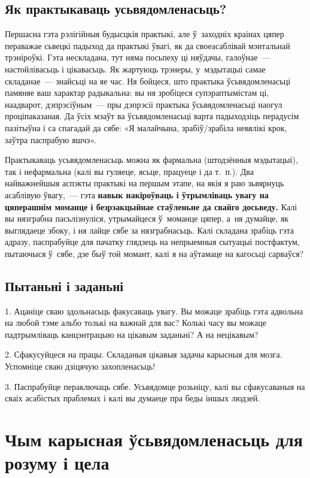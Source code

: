 \subsection*{Як практыкаваць усьвядомленасьць?}

Першасна гэта рэлігійныя будысцкія практыкі, але ў~заходніх краінах цяпер пераважае сьвецкі падыход да практыкі ўвагі, як да своеасаблівай мэнтальнай трэніроўкі. Гэта нескладана, тут няма посьпеху ці няўдачы, галоўнае~--- настойлівасьць і цікавасьць. Як жартуюць трэнеры, у~мэдытацыі самае складанае~--- знайсьці на яе час. Ня бойцеся, што практыка ўсьвядомленасьці памяняе ваш характар радыкальна: вы ня зробіцеся супэраптымістам ці, наадварот, дэпрэсіўным~--- пры дэпрэсіі практыка ўсьвядомленасьці наогул проціпаказаная. Да ўсіх мэаўт ва ўсьвядомленасьці варта падыходзіць перадусім пазітыўна і са спагадай да сябе: «Я малайчына, зрабіў/зрабіла невялікі крок, заўтра паспрабую яшчэ».

Практыкаваць усьвядомленасьць можна як фармальна (штодзённыя мэдытацыі), так і нефармальна (калі вы гуляеце, ясьце, працуеце і да т.~п.). Два найважнейшыя аспэкты практыкі на першым этапе, на якія я раю зьвярнуць асаблівую ўвагу,~--- гэта \textbf{навык накіроўваць і ўтрымліваць увагу на цяперашнім моманце і безрэакцыйнае стаўленьне да свайго досьведу.} Калі вы нязграбна пасьлізнуліся, утрымайцеся ў~моманце цяпер, а~ня думайце, як выглядаеце збоку, і ня лайце сябе за нязграбнасьць. Калі складана зрабіць гэта адразу, паспрабуйце для пачатку глядзець на непрыемныя сытуацыі постфактум, пытаючыся ў~сябе, дзе быў той момант, калі я на аўтамаце на кагосьці сарваўся?

\subsection*{Пытаньні і заданьні}

1. Ацаніце сваю здольнасьць факусаваць увагу. Вы можаце зрабіць гэта адвольна на любой тэме альбо толькі на важнай для вас? Колькі часу вы можаце падтрымліваць канцэнтрацыю на цікавым заданьні? А на нецікавым?

2. Сфакусуйцеся на працы. Складаныя цікавыя задачы карысныя для мозга. Успомніце сваю дзіцячую захопленасьць!

3. Паспрабуйце пераключаць сябе. Усьвядомце розьніцу, калі вы сфакусаваныя на сваіх асабістых праблемах і калі вы думаеце пра беды іншых людзей.


\section{Чым карысная ўсьвядомленасьць для розуму і цела}

